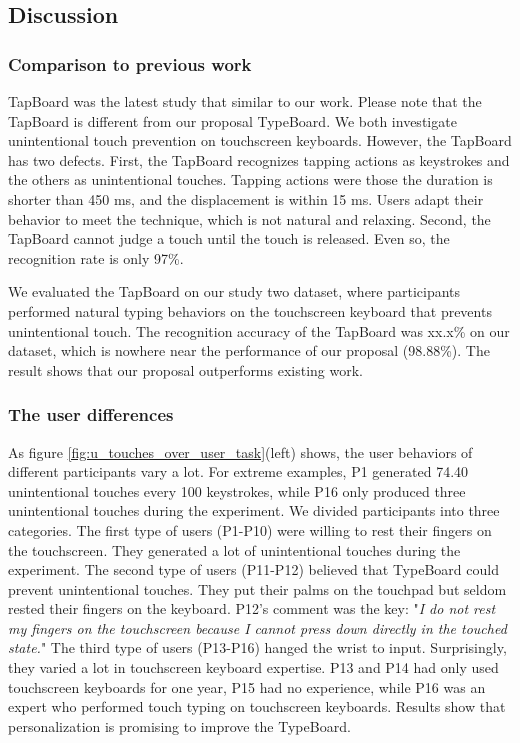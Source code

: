 \subsection{Discussion}

\subsubsection{Comparison to previous work}

TapBoard \cite{2013-TapBoard} was the latest study that similar to our work. 
Please note that the TapBoard is different from our proposal TypeBoard. We both investigate unintentional touch prevention on touchscreen keyboards. However, the TapBoard has two defects. First, the TapBoard recognizes tapping actions as keystrokes and the others as unintentional touches. Tapping actions were those the duration is shorter than 450 ms, and the displacement is within 15 ms. Users adapt their behavior to meet the technique, which is not natural and relaxing. Second, the TapBoard cannot judge a touch until the touch is released. Even so, the recognition rate is only 97\%.

We evaluated the TapBoard on our study two dataset, where participants performed natural typing behaviors on the touchscreen keyboard that prevents unintentional touch. The recognition accuracy of the TapBoard was xx.x\% on our dataset, which is nowhere near the performance of our proposal (98.88\%). The result shows that our proposal outperforms existing work.

\subsubsection{The user differences}

As figure \ref{fig:u_touches_over_user_task}(left) shows, the user behaviors of different participants vary a lot. For extreme examples, P1 generated 74.40 unintentional touches every 100 keystrokes, while P16 only produced three unintentional touches during the experiment. We divided participants into three categories. The first type of users (P1-P10) were willing to rest their fingers on the touchscreen. They generated a lot of unintentional touches during the experiment. The second type of users (P11-P12) believed that TypeBoard could prevent unintentional touches. They put their palms on the touchpad but seldom rested their fingers on the keyboard. P12's comment was the key: "\emph{I do not rest my fingers on the touchscreen because I cannot press down directly in the touched state.}" The third type of users (P13-P16) hanged the wrist to input. Surprisingly, they varied a lot in touchscreen keyboard expertise. P13 and P14 had only used touchscreen keyboards for one year, P15 had no experience, while P16 was an expert who performed touch typing on touchscreen keyboards. Results show that personalization is promising to improve the TypeBoard.

